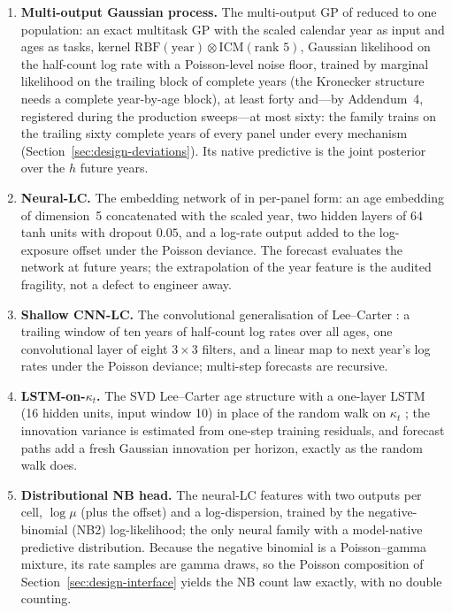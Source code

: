 \begin{enumerate}
  coefficient draws carry the OLS coefficient covariance. Regression rows
  use only year triples in which every age of the band is observed
  (Addendum~3~\S1). A coefficient draw whose companion matrix has spectral
  radius $\ge1$ is \emph{rejected and redrawn}, up to one hundred times per
  path; a path that cannot produce a stable draw makes the cell an error
  row. Predictive rates are never clipped to rescue a divergent draw, since
  clipping would convert divergence into a bounded interval and flatter the
  family's coverage (Addendum~3~\S7).
\item \textbf{Multi-output Gaussian process.} The multi-output GP of
  \citet{huynh2021multi} reduced to one population: an exact multitask GP
  with the scaled calendar year as input and ages as tasks, kernel
  $\mathrm{RBF}(\text{year})\otimes\mathrm{ICM}(\text{rank }5)$, Gaussian
  likelihood on the half-count log rate with a Poisson-level noise floor,
  trained by marginal likelihood on the trailing block of complete years
  (the Kronecker structure needs a complete year-by-age block), at least
  forty and---by Addendum~4, registered during the production sweeps---at
  most sixty: the family trains on the trailing sixty complete years of
  every panel under every mechanism (Section~\ref{sec:design-deviations}).
  Its native predictive is the joint posterior over the $h$ future years.
\item \textbf{Neural-LC.} The embedding network of \citet{richman2021neural}
  in per-panel form: an age embedding of dimension~5 concatenated with the
  scaled year, two hidden layers of 64 tanh units with dropout $0.05$, and a
  log-rate output added to the log-exposure offset under the Poisson
  deviance. The forecast evaluates the network at future years; the
  extrapolation of the year feature is the audited fragility, not a defect
  to engineer away.
\item \textbf{Shallow CNN-LC.} The convolutional generalisation of
  Lee--Carter \citep{perla2021time}: a trailing window of ten years of
  half-count log rates over all ages, one convolutional layer of eight
  $3\times3$ filters, and a linear map to next year's log rates under the
  Poisson deviance; multi-step forecasts are recursive.
\item \textbf{LSTM-on-$\kappa_t$.} The SVD Lee--Carter age structure with a
  one-layer LSTM (16 hidden units, input window 10) in place of the random
  walk on $\kappa_t$ \citep{nigri2019deep}; the innovation variance is
  estimated from one-step training residuals, and forecast paths add a
  fresh Gaussian innovation per horizon, exactly as the random walk does.
\item \textbf{Distributional NB head.} The neural-LC features with two
  outputs per cell, $\log\mu$ (plus the offset) and a log-dispersion,
  trained by the negative-binomial (NB2) log-likelihood; the only neural
  family with a model-native predictive distribution. Because the negative
  binomial is a Poisson--gamma mixture, its rate samples are gamma draws,
  so the Poisson composition of Section~\ref{sec:design-interface} yields
  the NB count law exactly, with no double counting.
\end{enumerate}

